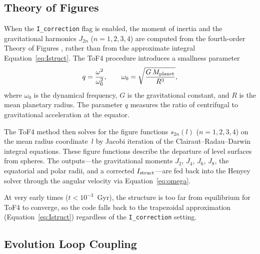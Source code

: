 \documentclass{aastex631}
\begin{document}
\subsection{Theory of Figures}\label{sec:tof}

When the \texttt{I\_correction} flag is enabled, the moment of inertia
and the gravitational harmonics $J_{2n}$ ($n = 1,2,3,4$) are computed
from the fourth-order Theory of Figures \citep[ToF4;][]{Nettelmann2017},
rather than from the approximate integral
Equation~\eqref{eq:Istruct}.  The ToF4 procedure introduces a
smallness parameter
\begin{equation}\label{eq:smallq}
  q = \frac{\omega^2}{\omega_0^2},
  \qquad
  \omega_0 = \sqrt{\frac{G\,M_{\rm planet}}{R^3}},
\end{equation}
where $\omega_0$ is the dynamical frequency, $G$ is the gravitational
constant, and $R$ is the mean planetary radius.  The parameter $q$
measures the ratio of centrifugal to gravitational acceleration at the
equator.

The ToF4 method then solves for the figure functions $s_{2n}(l)$ ($n =
1,2,3,4$) on the mean radius coordinate~$l$ by Jacobi iteration of the
Clairaut--Radau--Darwin integral equations.  These figure functions
describe the departure of level surfaces from spheres.  The
outputs---the gravitational moments $J_2$, $J_4$, $J_6$, $J_8$,
the equatorial and polar radii, and a corrected $I_{\rm struct}$---are
fed back into the Henyey solver through the angular velocity via
Equation~\eqref{eq:omega}.

At very early times ($t < 10^{-3}$~Gyr), the structure is too far from
equilibrium for ToF4 to converge, so the code falls back to the
trapezoidal approximation (Equation~\ref{eq:Istruct}) regardless of the
\texttt{I\_correction} setting.

\subsection{Evolution Loop Coupling}
\end{document}
